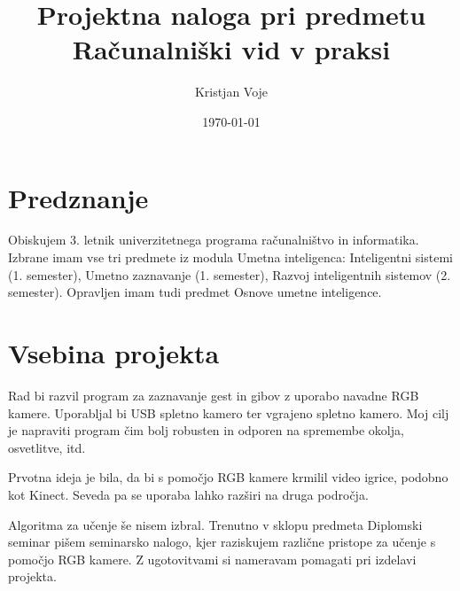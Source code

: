 \documentclass[a4paper, 12pt]{article}
\title{	Projektna naloga pri predmetu \\
		Računalniški vid v praksi	}
\author{Kristjan Voje}
\date{\today}
\begin{document}
\maketitle
\section{Predznanje}
Obiskujem 3. letnik univerzitetnega programa računalništvo in informatika.
Izbrane imam vse tri predmete iz modula Umetna inteligenca: Inteligentni sistemi (1. semester), Umetno zaznavanje (1. semester), Razvoj inteligentnih sistemov (2. semester).
Opravljen imam tudi predmet Osnove umetne inteligence.

\section{Vsebina projekta}
Rad bi razvil program za zaznavanje gest in gibov z uporabo navadne RGB kamere. Uporabljal bi USB spletno kamero ter vgrajeno spletno kamero. Moj cilj je napraviti program čim bolj robusten in odporen na spremembe okolja, osvetlitve, itd.

Prvotna ideja je bila, da bi s pomočjo RGB kamere krmilil video igrice, podobno kot Kinect. Seveda pa se uporaba lahko razširi na druga področja.

Algoritma za učenje še nisem izbral. Trenutno v sklopu predmeta Diplomski seminar pišem seminarsko nalogo, kjer raziskujem različne pristope za učenje s pomočjo RGB kamere. Z ugotovitvami si nameravam pomagati pri izdelavi projekta.
\end{document}

